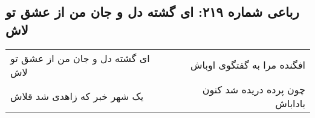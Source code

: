\begin{center}
\section*{رباعی شماره ۲۱۹: ای گشته دل و جان من از عشق تو لاش}
\label{sec:sh219}
\begin{longtable}{l p{0.5cm} r}
ای گشته دل و جان من از عشق تو لاش
&&
افگنده مرا به گفتگوی اوباش
\\
یک شهر خبر که زاهدی شد قلاش
&&
چون پرده دریده شد کنون باداباش
\\
\end{longtable}
\end{center}
